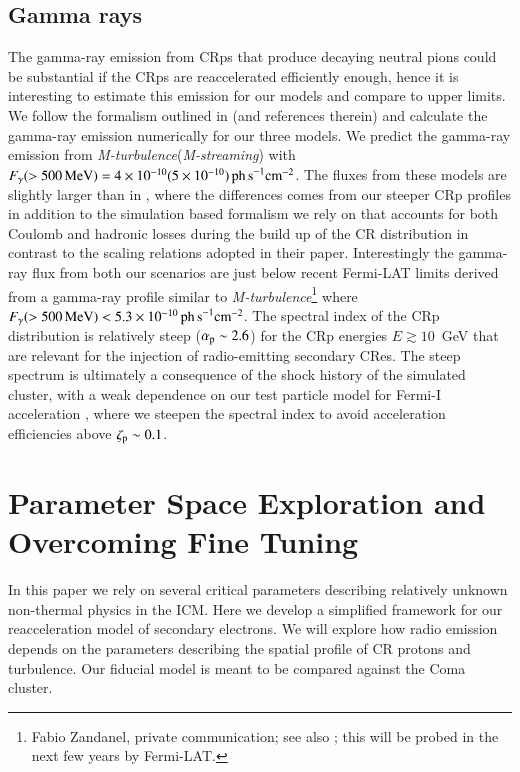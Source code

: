 \documentclass[fleqn,usenatbib,useAMS]{mnras}
\newcommand{\Mstream}{{\it M-streaming}\xspace}
\newcommand{\Mflatturb}{{\it M-turbulence}\xspace}
\begin{document}
\subsection{Gamma rays}
The gamma-ray emission from CRps that produce decaying neutral pions could be
substantial if the CRps are reaccelerated efficiently enough, hence it is
interesting to estimate this emission for our models and compare to upper
limits. We follow the formalism outlined in \cite{1999APh....12..169B} (and
references therein) and calculate the gamma-ray emission numerically for our
three models. We predict the gamma-ray emission from \Mflatturb (\Mstream) with
$F_\gamma(>500\,{\mathrm{MeV}})=4\times10^{-10} (5\times10^{-10}) \mathrm{ \,ph\,
  s}^{-1}\mathrm{cm}^{-2}$. The fluxes from these models are slightly larger
than in \cite{brunetti12}, where the differences comes from our steeper CRp
profiles in addition to the simulation based formalism we rely on that accounts
for both Coulomb and hadronic losses during the build up of the CR distribution
in contrast to the scaling relations adopted in their paper. Interestingly the
gamma-ray flux from both our scenarios are just below recent Fermi-LAT limits
derived from a gamma-ray profile similar to \Mflatturb\footnote{Fabio Zandanel,
  private communication; see also
  \citet{2014MNRAS.440..663Z,2014ApJ...787...18A}; this will be probed in the
  next few years by Fermi-LAT.} where
$F_\gamma(>500\,{\mathrm{MeV}})<5.3\times10^{-10} \mathrm{ \,ph\,
  s}^{-1}\mathrm{cm}^{-2}$.  The spectral index of the CRp distribution is
relatively steep ($\alpha_{{\mathrm{p}}}\sim2.6$) for the CRp energies $E \gtrsim
10$~GeV that are relevant for the injection of radio-emitting secondary
CRes. The steep spectrum is ultimately a consequence of the shock history of the
simulated cluster, with a weak dependence on our test particle model for Fermi-I
acceleration \citep{pinzke13}, where we steepen the spectral index to avoid
acceleration efficiencies above $\zeta_{{\mathrm{p}}} \sim 0.1$.


\section{Parameter Space Exploration and Overcoming Fine Tuning}
\label{sect:param_comp}
In this paper we rely on several critical parameters describing
relatively unknown non-thermal physics in the ICM. Here we develop a
simplified framework for our reacceleration model of secondary
electrons. We will explore how radio emission depends on the
parameters describing the spatial profile of CR protons and
turbulence. Our fiducial model is meant to be
compared against the Coma cluster.
\end{document}
